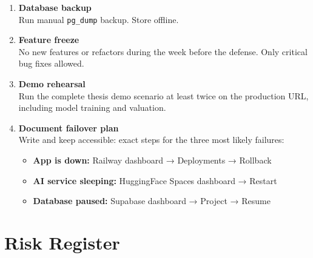 \documentclass[12pt,a4paper]{report}
\begin{document}
\begin{enumerate}[leftmargin=1.5em, label=\textbf{\arabic*.}, start=27]

    \item \textbf{Database backup} \\
    Run manual \texttt{pg\_dump} backup. Store offline.

    \item \textbf{Feature freeze} \\
    No new features or refactors during the week before the defense.
    Only critical bug fixes allowed.

    \item \textbf{Demo rehearsal} \\
    Run the complete thesis demo scenario at least twice on the
    production URL, including model training and valuation.

    \item \textbf{Document failover plan} \\
    Write and keep accessible: exact steps for the three most likely
    failures:
    \begin{itemize}[leftmargin=1em]
        \item \textbf{App is down:} Railway dashboard → Deployments → Rollback
        \item \textbf{AI service sleeping:} HuggingFace Spaces dashboard → Restart
        \item \textbf{Database paused:} Supabase dashboard → Project → Resume
    \end{itemize}

\end{enumerate}

\chapter{Risk Register}
\label{ch:risks}
\end{document}
